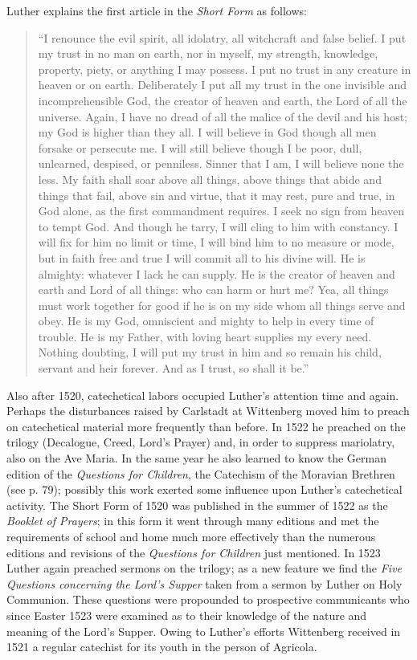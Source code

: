 Luther explains the first article in the \emph{Short Form} as follows:
\begin{quote}
“I renounce the evil spirit, all idolatry, all witchcraft and false belief. I put my trust in no man on earth, nor in myself, my strength, knowledge, property, piety, or anything I may possess. I put no trust in any creature in heaven or on earth. Deliberately I put all my trust in the one invisible and incomprehensible God, the creator of heaven and earth, the Lord of all the universe. Again, I have no dread of all the malice of the devil and his host; my God is higher than they all. I will believe in God though all men forsake or persecute me. I will still believe though I be poor, dull, unlearned, despised, or penniless. Sinner that I am, I will believe none the less. My faith shall soar above all things, above things that abide and things
that fail, above sin and virtue, that it may rest, pure and true, in God alone, as the first commandment requires. I seek no sign from heaven to tempt God. And though he tarry, I will cling to him with constancy. I will fix for him no limit or time, I will bind him to no measure or mode, but in faith free and true I will commit all to his divine will. He is almighty: whatever I lack he can supply. He is the creator of heaven and earth and Lord of all things: who can harm or hurt me? Yea, all things must work together for good if he is on my side whom all things serve and obey. He is my God, omniscient and mighty to help in every time of trouble. He is my Father, with loving heart supplies my every need. Nothing doubting, I will put my trust in him and so remain his child, servant and heir forever. And as I trust, so shall it be.”
\end{quote}

Also after 1520, catechetical labors occupied Luther’s attention time and again. Perhaps the disturbances raised by Carlstadt at Wittenberg moved him to preach on catechetical material more frequently than before. In 1522 he preached on the trilogy (Decalogue, Creed, Lord’s Prayer) and, in order to suppress mariolatry, also on the Ave Maria. In the same year he also learned to know the German edition of the \emph{Questions for Children}, the Catechism of the Moravian Brethren (see p. 79); possibly this work exerted some influence upon Luther’s catechetical activity. The Short Form of 1520 was published in the summer of 1522 as the \emph{Booklet of Prayers}; in this form it went through many editions and met the requirements of school and home much more effectively than the numerous editions and revisions of the \emph{Questions for Children} just mentioned. In 1523 Luther again preached sermons on the trilogy; as a new feature we find the \emph{Five Questions concerning the Lord’s Supper} taken from a sermon by Luther on Holy Communion. These questions were propounded to prospective communicants who since Easter 1523 were examined as to their knowledge of the nature and meaning of the Lord’s Supper. Owing to Luther’s efforts Wittenberg received in 1521 a regular catechist for its youth in the person of Agricola.

